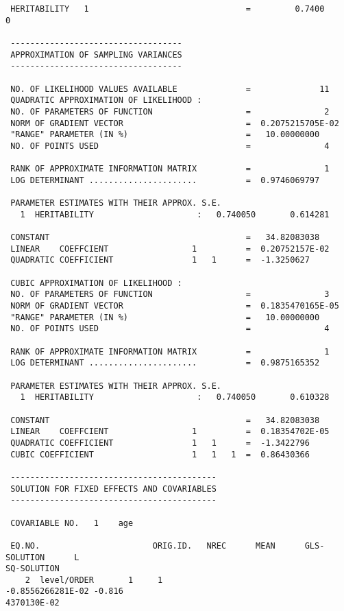 \documentclass[titlepage]{article}  %
\begin{document}
\begin{verbatim}
 HERITABILITY   1                                =         0.7400           0
  
 -----------------------------------
 APPROXIMATION OF SAMPLING VARIANCES
 -----------------------------------
  
 NO. OF LIKELIHOOD VALUES AVAILABLE              =              11
 QUADRATIC APPROXIMATION OF LIKELIHOOD :
 NO. OF PARAMETERS OF FUNCTION                   =               2
 NORM OF GRADIENT VECTOR                         =  0.2075215705E-02
 "RANGE" PARAMETER (IN %)                        =   10.00000000    
 NO. OF POINTS USED                              =               4
  
 RANK OF APPROXIMATE INFORMATION MATRIX          =               1
 LOG DETERMINANT ......................          =  0.9746069797    
  
 PARAMETER ESTIMATES WITH THEIR APPROX. S.E.
   1  HERITABILITY                     :   0.740050       0.614281    
  
 CONSTANT                                        =   34.82083038    
 LINEAR    COEFFCIENT                 1          =  0.20752157E-02
 QUADRATIC COEFFICIENT                1   1      =  -1.3250627    
  
 CUBIC APPROXIMATION OF LIKELIHOOD :
 NO. OF PARAMETERS OF FUNCTION                   =               3
 NORM OF GRADIENT VECTOR                         =  0.1835470165E-05
 "RANGE" PARAMETER (IN %)                        =   10.00000000    
 NO. OF POINTS USED                              =               4
  
 RANK OF APPROXIMATE INFORMATION MATRIX          =               1
 LOG DETERMINANT ......................          =  0.9875165352    
  
 PARAMETER ESTIMATES WITH THEIR APPROX. S.E.
   1  HERITABILITY                     :   0.740050       0.610328    
  
 CONSTANT                                        =   34.82083038    
 LINEAR    COEFFCIENT                 1          =  0.18354702E-05
 QUADRATIC COEFFICIENT                1   1      =  -1.3422796    
 CUBIC COEFFICIENT                    1   1   1  =  0.86430366    
  
 ------------------------------------------
 SOLUTION FOR FIXED EFFECTS AND COVARIABLES
 ------------------------------------------

 COVARIABLE NO.   1    age         

 EQ.NO.                       ORIG.ID.   NREC      MEAN      GLS-SOLUTION      L
SQ-SOLUTION
    2  level/ORDER       1     1                        -0.8556266281E-02 -0.816
4370130E-02


\end{verbatim}
\end{document}
